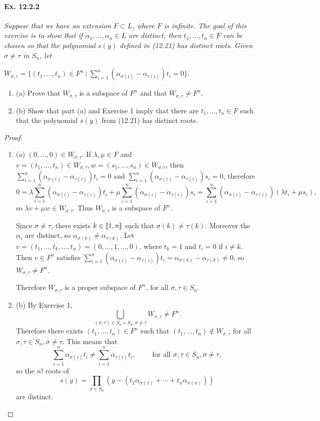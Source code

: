 \documentclass[11pt,a4paper]{article}
\def\gcro{\mbox{[\hspace{-.15em}[}}%
\def\dcro{\mbox{]\hspace{-.15em}]}}
\newcommand{\be} {\begin{enumerate}}
\newcommand{\ee} {\end{enumerate}}
\begin{document}
\paragraph{Ex. 12.2.2}

{\it Suppose that we have an extension $F \subset L$, where $F$ is infinite. The goal of this exercise is to show that if $\alpha_1,\ldots,\alpha_n \in L$ are distinct, then $t_1,\ldots,t_n \in F$ can be chosen so that the polynomial $s(y)$ defined in (12.21) has distinct roots. Given $\sigma \ne \tau$ in $S_n$, let
\begin{center}
$W_{\sigma,\tau} =  \{(t_1,\ldots,t_n) \in F^n \ {\big | }\ \sum_{i=1}^n (\alpha_{\sigma(i)} - \alpha_{\tau(i)}) t_i = 0 \}.$
\be
\item[(a)] Prove that $W_{\sigma,\tau}$ is a subspace of $F^n$ and that $W_{\sigma,\tau} \ne F^n$.
\item[(b)] Show that part (a) and Exercise 1 imply that there are $t_1,\ldots,t_n \in F$ such that the polynomial $s(y)$ from (12.21) has distinct roots.
\ee

\end{center}
}

\begin{proof}
\be
\item[(a)] $(0,\ldots,0) \in W_{\sigma,\tau}$. If $\lambda, \mu \in F$  and  $ v = (t_1,\ldots,t_n) \in W_{\sigma,\tau}, w = (s_1,\ldots,s_n) \in W_{\sigma,\tau}$, then $ \sum_{i=1}^n (\alpha_{\sigma(i)} - \alpha_{\tau(i)}) t_i = 0$ and $ \sum_{i=1}^n (\alpha_{\sigma(i)} - \alpha_{\tau(i)}) s_i = 0$, therefore
$$0 =  \lambda \sum_{i=1}^n (\alpha_{\sigma(i)} - \alpha_{\tau(i)}) t_i  + \mu\sum_{i=1}^n (\alpha_{\sigma(i)} - \alpha_{\tau(i)}) s_i =  \sum_{i=1}^n (\alpha_{\sigma(i)} - \alpha_{\tau(i)}) (\lambda t_i + \mu s_i),$$
so $\lambda v + \mu w \in W_{\sigma,\tau}$. Thus $W_{\sigma,\tau}$ is a subspace of $F^n$.

Since $\sigma \ne \tau$, there exists $k \in \gcro 1, n \dcro$ such that $\sigma(k) \ne \tau(k)$. Moreover the $\alpha_i$ are distinct, so $\alpha_{\sigma(k)} \ne \alpha_{\tau(k)}$. Let $v = (t_1,\ldots,t_k, \ldots,t_n) = (0,\ldots,1,\ldots,0)$, where $t_k = 1$ and $t_i = 0$ if $i\ne k$. Then $v \in F^n$ satisfies $ \sum_{i=1}^n (\alpha_{\sigma(i)} - \alpha_{\tau(i)}) t_i  = \alpha_{\sigma(k)} - \alpha_{\tau(k)} \ne 0$, so $W_{\sigma,\tau} \ne F^n$.

Therefore $W_{\sigma,\tau}$ is a proper subspace of $F^n$, for all $\sigma, \tau \in S_n$.

\item[(b)] By Exercise 1, 
$$\bigcup_{(\sigma,\tau) \in S_n \times S_n, \sigma \ne \tau} W_{\sigma,\tau} \ne F^n.$$
Therefore there exists $(t_1,\ldots,t_n) \in F^n$ such that $(t_1,\ldots,t_n) \not \in W_{\sigma,\tau}$ for all $\sigma,\tau \in S_n, \sigma \ne \tau$. This means that
$$\sum_{i=1}^n \alpha_{\sigma(i)}t_i \ne  \sum_{i=1}^n \alpha_{\tau(i)}t_i,\qquad \text { for all } \sigma,\tau \in S_n, \sigma \ne \tau,$$
so the $n!$ roots of 
$$s(y) = \prod_{\sigma \in S_n}  \left(y - (t_1\alpha_{\sigma(1)} + \cdots + t_n \alpha_{\sigma(n)})\right)$$
are distinct.
\ee
\end{proof}
\end{document}
